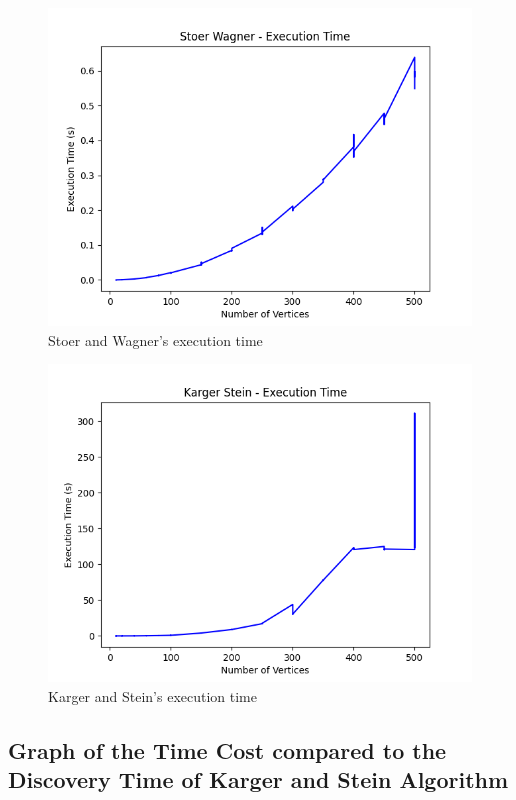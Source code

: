 \begin{figure}[H]
	\hspace{0cm}\includegraphics[width=17cm]{Img/StoerWagner_ExecutionTime.png}
	\caption{Stoer and Wagner's execution time}
\end{figure}

\begin{figure}[H]
	\hspace{0cm}\includegraphics[width=17cm]{Img/KargerSteinTimeCostGraph120.png}
	\caption{Karger and Stein's execution time}
\end{figure}



\subsection{Graph of the Time Cost compared to the Discovery Time of Karger and Stein Algorithm}

